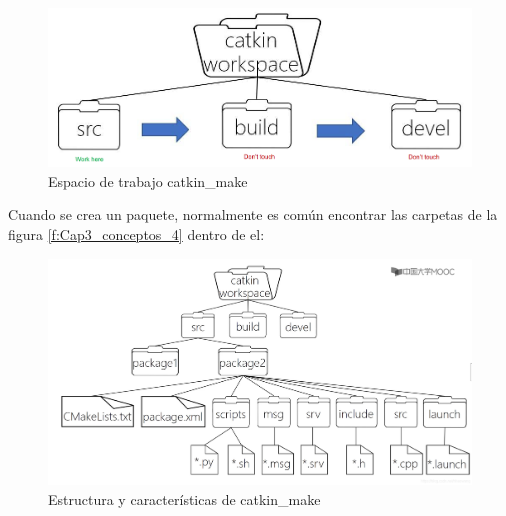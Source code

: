             \begin{figure}[htb]
                \centering
                \includegraphics[width=0.8\linewidth]{Main/Chapter3/Images3/n_s_a_3.png}
                \caption{Espacio de trabajo catkin\_make \cite{cmake_blogcsdn}}
                \label{f:Cap3_conceptos_3}
            \end{figure} 
            
               \newpage


            Cuando se crea un paquete, normalmente es común encontrar las carpetas de la figura \eqref{f:Cap3_conceptos_4} dentro de el:
            
            \begin{figure}[htb]
                \centering
                \includegraphics[width=1.0\linewidth]{Main/Chapter3/Images3/n_s_a_4.png}
                \caption{Estructura y características de catkin\_make \cite{cmake_blogcsdn}}
                \label{f:Cap3_conceptos_4}
            \end{figure} 

